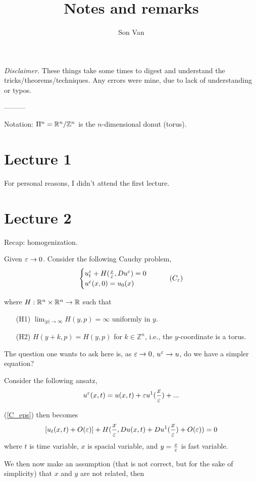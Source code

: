 \documentclass[11pt, oneside]{amsart}   	%
\title{Notes and remarks}
\author{Son Van}
\date{}							%
\newcommand\Z{\mathbb{Z}} \newcommand\N{\mathbb{N}} \newcommand\C{\mathbb{C}}
\begin{document}
\maketitle
\emph{Disclaimer.} These things take some times to digest and understand the tricks/theorems/techniques. Any errors were mine, due to lack of understanding or typos.

---------

Notation: $\Pi^n=\R^n/\Z^n$ is the $n$-dimensional donut (torus).
\section*{Lecture 1}
For personal reasons, I didn't attend the first lecture.

\section*{Lecture 2}
Recap: homogenization.

Given $\varepsilon\to 0$. Consider the following Cauchy problem,
\begin{equation}
	\begin{cases}
		u^\eps_t + H(\frac{x}{\eps}, Du^\eps)=0\\
		u^\eps(x,0)=u_0(x)
	\end{cases}\tag{$C_\eps$}\label{C_eps}
\end{equation}

where $H: \mathbb{R}^n\times\mathbb{R}^n \to \mathbb{R}$ such that

\begin{enumerate}
	\item[(H1)] $\lim_{|p|\to \infty} H(y, p) = \infty$ uniformly in $y$.

	\item[(H2)] $H(y+k, p) = H(y,p)$ for $k\in \Z^n$, i.e., the $y$-coordinate is a torus.
\end{enumerate}

The question one wants to ask here is, as $\varepsilon\to 0$, $u^\varepsilon\to u$, do we have a simpler equation?

Consider the following ansatz,
$$u^\varepsilon(x,t) = u(x,t) + \varepsilon u^1(\frac{x}{\varepsilon}) + ...$$

(\ref{C_eps}) then becomes
$$[u_t(x,t)+ O(\varepsilon)] + H(\frac{x}{\varepsilon}, Du(x,t)+ Du^1(\frac{x}{\varepsilon})+ O(\varepsilon))=0$$
where $t$ is time variable, $x$ is spacial variable, and $y=\frac{x}{\varepsilon}$ is fast variable.

We then now make an assumption (that is not correct, but for the sake of simplicity) that $x$ and $y$ are not related, then
\end{document}
